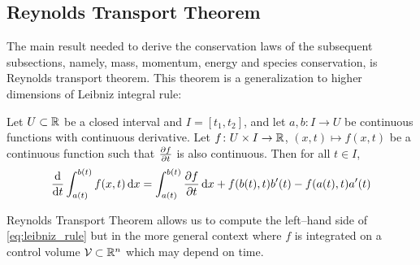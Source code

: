 
\subsection{Reynolds Transport Theorem}

The main result needed to derive the conservation laws of the subsequent subsections, namely, mass, momentum, energy and species conservation, is Reynolds transport theorem. This theorem is a generalization to higher dimensions of Leibniz integral rule:

\begin{theorem}
	Let $U \subset \mathbb{R}$ be a closed interval and $I = [t_1, t_2]$, and let $a, b \colon I \rightarrow U$ be continuous functions with continuous derivative. Let $f \colon U \times I \rightarrow \mathbb{R}$, $(x,t) \mapsto f(x,t)$ be a continuous function such that $\pdv{f}{t}$ is also continuous. Then for all $t \in I$,
	\begin{equation} \label{eq:leibniz_rule}
		\frac{\dd}{\dd{t}} \int_{a(t)}^{b(t)} f(x,t) \dd{x} = 
		\int_{a(t)}^{b(t)} \pdv{f}{t}(x,t) \dd{x} + f(b(t),t) b'(t) - f(a(t),t) a'(t)
	\end{equation}
\end{theorem}

\noindent
Reynolds Transport Theorem allows us to compute the left--hand side of \eqref{eq:leibniz_rule} but in the more general context where $f$ is integrated on a control volume $\mathcal{V}_{} \subset \mathbb{R}^n$ which may depend on time. 

